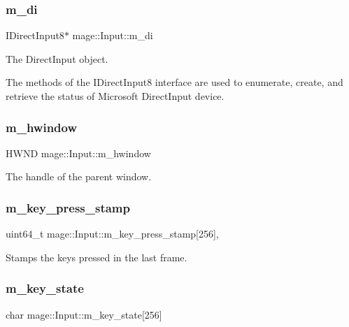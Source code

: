 \subsubsection{\texorpdfstring{m\+\_\+di}{m\_di}}
{\footnotesize\ttfamily I\+Direct\+Input8$\ast$ mage\+::\+Input\+::m\+\_\+di\hspace{0.3cm}{\ttfamily [protected]}}

The Direct\+Input object.

The methods of the I\+Direct\+Input8 interface are used to enumerate, create, and retrieve the status of Microsoft Direct\+Input device. \hypertarget{classmage_1_1_input_a1b33f0e27c18870391633b1883c3f615}{}\label{classmage_1_1_input_a1b33f0e27c18870391633b1883c3f615} 
\subsubsection{\texorpdfstring{m\+\_\+hwindow}{m\_hwindow}}
{\footnotesize\ttfamily H\+W\+ND mage\+::\+Input\+::m\+\_\+hwindow\hspace{0.3cm}{\ttfamily [protected]}}

The handle of the parent window. \hypertarget{classmage_1_1_input_a383109c45d2a0b0edeb482de8b53d53b}{}\label{classmage_1_1_input_a383109c45d2a0b0edeb482de8b53d53b} 
\subsubsection{\texorpdfstring{m\+\_\+key\+\_\+press\+\_\+stamp}{m\_key\_press\_stamp}}
{\footnotesize\ttfamily uint64\+\_\+t mage\+::\+Input\+::m\+\_\+key\+\_\+press\+\_\+stamp\mbox{[}256\mbox{]}\hspace{0.3cm}{\ttfamily [mutable]}, {\ttfamily [protected]}}

Stamps the keys pressed in the last frame. \hypertarget{classmage_1_1_input_aa0f92d1f06d3f952611ccdb69c9da1d4}{}\label{classmage_1_1_input_aa0f92d1f06d3f952611ccdb69c9da1d4} 
\subsubsection{\texorpdfstring{m\+\_\+key\+\_\+state}{m\_key\_state}}
{\footnotesize\ttfamily char mage\+::\+Input\+::m\+\_\+key\+\_\+state\mbox{[}256\mbox{]}\hspace{0.3cm}{\ttfamily [protected]}}

